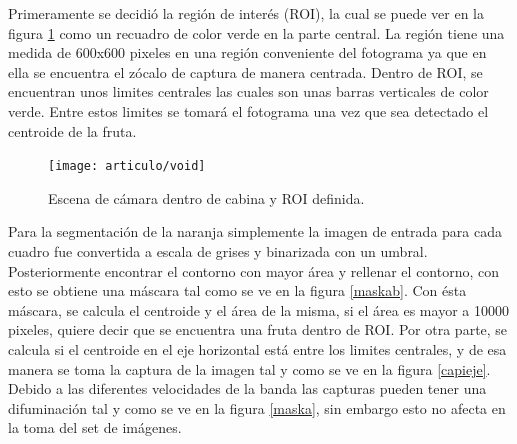 \documentclass[twoside,spanish,ESP,MSc]{plantillaLabUPV}
\theoremstyle{definition}
\begin{document}
Primeramente se decidió la región de interés (ROI), la cual se puede ver en la figura \ref{fig:void} como un recuadro de color verde en la parte central. La región tiene una medida de 600x600 pixeles en una región conveniente del fotograma ya que en ella se encuentra el zócalo de captura de manera centrada. Dentro de ROI, se encuentran unos limites centrales las cuales son unas barras verticales de color verde. Entre estos limites se tomará el fotograma una vez que sea detectado el centroide de la fruta.

\begin{figure}
	\centering
	\texttt{[image: articulo/void]}
	\caption{Escena de cámara dentro de cabina y ROI definida.}
	\label{fig:void}
\end{figure}

Para la segmentación de la naranja simplemente la imagen de entrada para cada cuadro fue convertida a escala de grises y binarizada con un umbral. Posteriormente encontrar el contorno con mayor área y rellenar el contorno, con esto se obtiene una máscara tal como se ve en la figura \ref{maskab}. Con ésta máscara, se calcula el centroide y el área de la misma, si el área es mayor a 10000 pixeles, quiere decir que se encuentra una fruta dentro de ROI. Por otra parte, se calcula si el centroide en el eje horizontal está entre los limites centrales, y de esa manera se toma la captura de la imagen tal y como se ve en la figura \ref{capieje}. Debido a las diferentes velocidades de la banda las capturas pueden tener una difuminación tal y como se ve en la figura \ref{maska}, sin embargo esto no afecta en la toma del set de imágenes.
\end{document}
